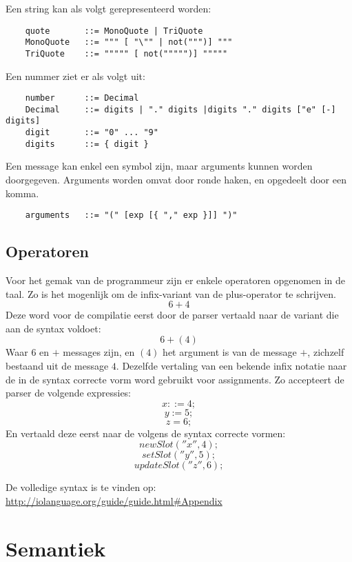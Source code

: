 \documentclass[12pt]{article}
\begin{document}
Een string kan als volgt gerepresenteerd worden:
\begin{lstlisting}
	quote 		::= MonoQuote | TriQuote
	MonoQuote 	::= """ [ "\"" | not(""")] """
	TriQuote 	::= """"" [ not(""""")] """""
\end{lstlisting}
Een nummer ziet er als volgt uit:
\begin{lstlisting}
	number    	::= Decimal
	Decimal  	::= digits | "." digits |digits "." digits ["e" [-] digits]
	digit 		::= "0" ... "9"
	digits 		::= { digit }
\end{lstlisting}

Een message kan enkel een symbol zijn, maar arguments kunnen worden doorgegeven. Arguments worden omvat door ronde haken, en opgedeelt door een komma.
\begin{lstlisting}
	arguments 	::= "(" [exp [{ "," exp }]] ")"
\end{lstlisting}
\subsection{Operatoren}
Voor het gemak van de programmeur zijn er enkele operatoren opgenomen in de taal. Zo is het mogenlijk om de infix-variant van de plus-operator te schrijven.
\[6 + 4\]
Deze word voor de compilatie eerst door de parser vertaald naar de variant die aan de syntax voldoet:
\[6 +(4)\]
Waar \(6\) en \(+\) messages zijn, en \( (4) \) het argument is van de message \(+\), zichzelf bestaand uit de message \(4\). Dezelfde vertaling van een bekende infix notatie naar de in de syntax correcte vorm word gebruikt voor assignments. Zo accepteert de parser de volgende expressies:
\[x ::= 4;\]
\[y := 5;\]
\[z = 6;\]
En vertaald deze eerst naar de volgens de syntax correcte vormen:
\[newSlot(''x'', 4);\]
\[setSlot(''y'', 5);\]
\[updateSlot(''z'', 6);\]

De volledige syntax is te vinden op: \url{http://iolanguage.org/guide/guide.html#Appendix}

\section{Semantiek}
\end{document}

